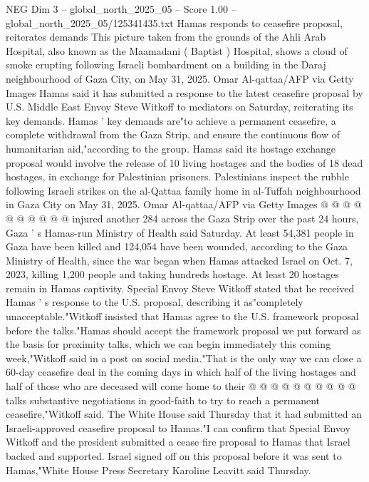 \begin{textsample}{NEG Dim 3 – global\_north\_2025\_05 – Score 1.00 – global\_north\_2025\_05/125341435.txt}  \label{ex:f3_neg_324}
Hamas responds to ceasefire proposal, reiterates demands This picture taken from the grounds of the Ahli Arab Hospital, also known as the Maamadani ( Baptist ) Hospital, shows a cloud of smoke erupting following Israeli bombardment on a building in the Daraj neighbourhood of Gaza City, on May 31, 2025.
Omar Al-qattaa/AFP via Getty Images Hamas said it has submitted a response to the latest ceasefire proposal by U.S.
Middle East Envoy Steve Witkoff to mediators on Saturday, reiterating its key demands.
Hamas ' key demands are"to achieve a permanent ceasefire, a complete withdrawal from the Gaza Strip, and ensure the continuous flow of humanitarian aid,"according to the group.
Hamas said its hostage exchange proposal would involve the release of 10 living hostages and the bodies of 18 dead hostages, in exchange for Palestinian prisoners.
Palestinians inspect the rubble following Israeli strikes on the al-Qattaa family home in al-Tuffah neighbourhood in Gaza City on May 31, 2025.
Omar Al-qattaa/AFP via Getty Images @ @ @ @ @ @ @ @ @ @ injured another 284 across the Gaza Strip over the past 24 hours, Gaza ' s Hamas-run Ministry of Health said Saturday.
At least 54,381 people in Gaza have been killed and 124,054 have been wounded, according to the Gaza Ministry of Health, since the war began when Hamas attacked Israel on Oct. 7, 2023, killing 1,200 people and taking hundreds hostage.
At least 20 hostages remain in Hamas captivity.
Special Envoy Steve Witkoff stated that he received Hamas ' s response to the U.S. proposal, describing it as"completely unacceptable."Witkoff insisted that Hamas agree to the U.S. framework proposal before the talks."Hamas should accept the framework proposal we put forward as the basis for proximity talks, which we can begin immediately this coming week,"Witkoff said in a post on social media."That is the only way we can close a 60-day ceasefire deal in the coming days in which half of the living hostages and half of those who are deceased will come home to their @ @ @ @ @ @ @ @ @ @ talks substantive negotiations in good-faith to try to reach a permanent ceasefire,"Witkoff said.
The White House said Thursday that it had submitted an Israeli-approved ceasefire proposal to Hamas."I can confirm that Special Envoy Witkoff and the president submitted a cease fire proposal to Hamas that Israel backed and supported.
Israel signed off on this proposal before it was sent to Hamas,"White House Press Secretary Karoline Leavitt said Thursday.

\end{textsample}
